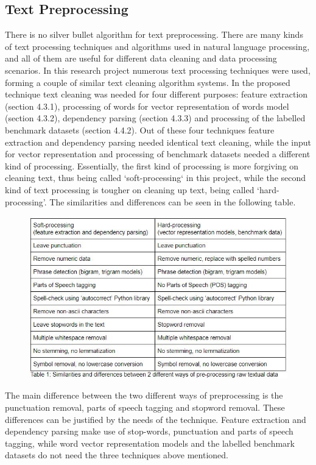 \documentclass{sig-alternate}
\begin{document}
\subsection{Text Preprocessing}
There is no silver bullet algorithm for text preprocessing. There are many kinds of text processing techniques and algorithms used in natural language processing, and all of them are useful for different data cleaning and data processing scenarios. In this research project numerous text processing techniques were used, forming a couple of similar text cleaning algorithm systems. 
In the proposed technique text cleaning was needed for four different purposes: feature extraction (section 4.3.1), processing of words for vector representation of words model (section 4.3.2), dependency parsing (section 4.3.3) and processing of the labelled benchmark datasets (section 4.4.2). Out of these four techniques feature extraction and dependency parsing needed identical text cleaning, while the input for vector representation and processing of benchmark datasets needed a different kind of processing. Essentially, the first kind of processing is more forgiving on cleaning text, thus being called `soft-processing` in this project, while the second kind of text processing is tougher on cleaning up text, being called `hard-processing'. The similarities and differences can be seen in the following table.

\begin{figure}
\centering
\includegraphics[scale=0.65]{images/text_processing_table.JPG}
\end{figure}

The main difference between the two different ways of preprocessing is the punctuation removal, parts of speech tagging and stopword removal. These differences can be justified by the needs of the technique. Feature extraction and dependency parsing make use of stop-words, punctuation and parts of speech tagging, while word vector representation models and the labelled benchmark datasets do not need the three techniques above mentioned.
\end{document}
